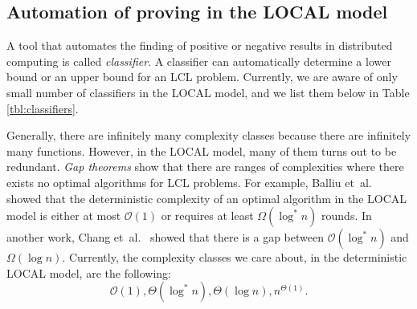 
\subsection{Automation of proving in the LOCAL model} \label{sec:prior_work:automation_of_proving_in_local_model}


A tool that automates the finding of positive or negative results in distributed computing is called \emph{classifier}.
A classifier can automatically determine a lower bound or an upper bound for an LCL problem.
Currently, we are aware of only small number of classifiers in the LOCAL model, and we list them below in Table \ref{tbl:classifiers}.

Generally, there are infinitely many complexity classes because there are infinitely many functions.
However, in the LOCAL model, many of them turns out to be redundant.
\emph{Gap theorems} show that there are ranges of complexities where there exists no optimal algorithms for LCL problems.
For example, Balliu et~al.~\cite{DBLP:conf/podc/BalliuHOS19} showed that the deterministic complexity of an optimal algorithm in the LOCAL model is either at most \(\mathcal{O}(1)\) or requires at least \(\Omega(\log^* n)\) rounds.
In another work, Chang et~al.~\cite{DBLP:conf/focs/ChangKP16} showed that there is a gap between \(\mathcal{O}(\log^* n)\) and \(\Omega(\log n)\).
Currently, the complexity classes we care about, in the deterministic LOCAL model, are the following:
\[\mathcal{O}(1), \Theta(\log^* n), \Theta(\log n), n^{\Theta(1)}.\]


